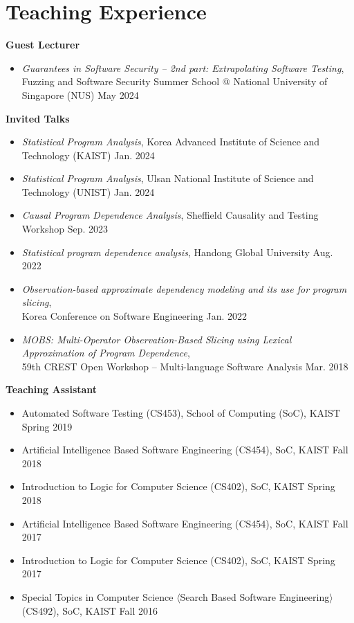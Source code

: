 \documentclass[letterpaper,11pt]{article}
\begin{document}
\section{Teaching Experience}

\textbf{Guest Lecturer}\vspace{-4pt}
\begin{itemize}
  \item \emph{Guarantees in Software Security -- 2nd part: Extrapolating Software Testing}, \\Fuzzing and Software Security Summer School @ National University of Singapore (NUS) \hfill May 2024
\end{itemize}

\textbf{Invited Talks}\vspace{-4pt}
\begin{itemize}
  \item \emph{Statistical Program Analysis}, Korea Advanced Institute of Science and Technology (KAIST) \hfill Jan. 2024
  \item \emph{Statistical Program Analysis}, Ulsan National Institute of Science and Technology (UNIST) \hfill Jan. 2024
  \item \emph{Causal Program Dependence Analysis}, Sheffield Causality and Testing Workshop \hfill Sep. 2023
  \item \emph{Statistical program dependence analysis}, Handong Global University \hfill Aug. 2022
  \item \emph{Observation-based approximate dependency modeling and its use for program slicing}, \\Korea Conference on Software Engineering \hfill Jan. 2022
  \item \emph{MOBS: Multi-Operator Observation-Based Slicing using Lexical Approximation of Program Dependence}, \\59th CREST Open Workshop -- Multi-language Software Analysis \hfill Mar. 2018
\end{itemize}

\textbf{Teaching Assistant}\vspace{-4pt}
\begin{itemize}
  \item Automated Software Testing (CS453), School of Computing (SoC), KAIST \hfill Spring 2019
  \item Artificial Intelligence Based Software Engineering (CS454), SoC, KAIST \hfill Fall 2018
  \item Introduction to Logic for Computer Science (CS402), SoC, KAIST \hfill Spring 2018
  \item Artificial Intelligence Based Software Engineering (CS454), SoC, KAIST \hfill Fall 2017
  \item Introduction to Logic for Computer Science (CS402), SoC, KAIST \hfill Spring 2017
  \item Special Topics in Computer Science $\langle$Search Based Software Engineering$\rangle$ (CS492), SoC, KAIST \hfill Fall 2016

\end{itemize}
\end{document}
